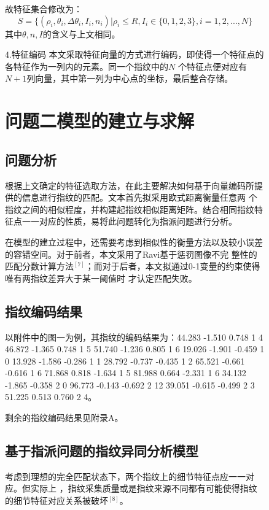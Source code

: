 \documentclass{whutmod}
\begin{document}
\begin{spacing}{1.2}
\begin{figure}[H]
故特征集合修改为：
$$ S=\{(\rho_i,\theta_i,\Delta\theta_i,I_i,n_i)|\rho_i \leq R,I_i\in\{0,1,2,3\},i=1,2,...,N \}$$
其中$\theta,n,I$的含义与上文相同。

4.特征编码
本文采取特征向量的方式进行编码，即使得一个特征点的各特征作为一列内的元素。同一个指纹中的$N$
个特征点便对应有$N+1$列向量，其中第一列为中心点的坐标，最后整合存储。








\section{问题二模型的建立与求解}

\subsection{问题分析}

根据上文确定的特征选取方法，在此主要解决如何基于向量编码所提供的信息进行指纹的匹配。文本首先拟采用欧式距离衡量任意两
个指纹之间的相似程度，并构建起指纹相似距离矩阵。结合相同指纹特征点一一对应的性质，易将此问题转化为指派问题进行分析。

在模型的建立过程中，还需要考虑到相似性的衡量方法以及较小误差的容错空间。对于前者，本文采用了Ravi基于惩罚图像不完
整性的匹配分数计算方法$^{[7]}$；而对于后者，本文拟通过0-1变量的约束使得唯有两指纹差异大于某一阈值时
才认定匹配失败。

\subsection{指纹编码结果}

以附件中的图一为例，其指纹的编码结果为：44.283 -1.510 0.748 1 4
46.872 -1.365 0.748 1 5
51.740 -1.236 0.805 1 6
19.026 -1.901 -0.459 1 0
13.928 -1.586 -0.286 1 1
28.792 -0.737 -0.435 1 2
65.521 -0.661 -0.616 1 6
71.868 0.818 -1.634 1 5
81.988 0.664 -2.331 1 6
34.132 -1.865 -0.358 2 0
96.773 -0.143 -0.692 2 12
39.051 -0.615 -0.499 2 3
51.225 0.513 0.760 2 4。

剩余的指纹编码结果见附录A。

\subsection{基于指派问题的指纹异同分析模型}

考虑到理想的完全匹配状态下，两个指纹上的细节特征点应一一对应。但实际上
，指纹采集质量或是指纹来源不同都有可能使得指纹的细节特征对应关系被破坏$^{[8]}$。


\end{figure}
\end{spacing}
\end{document}
